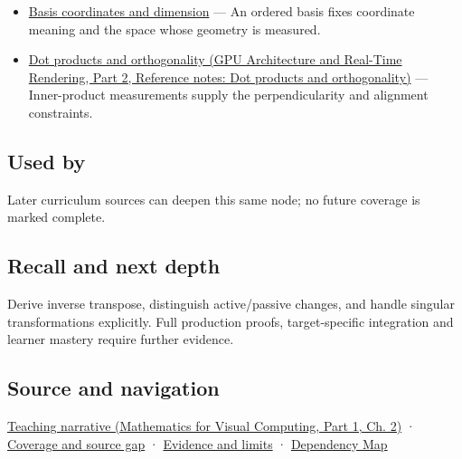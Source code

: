 \begin{itemize}
\tightlist
\item
  \hyperref[appendix-ce0341f7ea0d]{Basis coordinates and dimension} --- An ordered basis fixes coordinate meaning and the space whose geometry is measured.
\item
  \href{../06-GPU-Architecture-and-Real-Time-Rendering-P02/main.pdf\#appendix-8bc4e8fc547c}{Dot products and orthogonality (GPU Architecture and Real-Time Rendering, Part 2, Reference notes: Dot products and orthogonality)} --- Inner-product measurements supply the perpendicularity and alignment constraints.
\end{itemize}

\subsection{Used by}\label{appendix-46da295c6787-used-by}

\hypertarget{appendix-46da295c6787-used-by}{}

Later curriculum sources can deepen this same node; no future coverage is marked complete.

\subsection{Recall and next depth}\label{appendix-46da295c6787-recall-and-next-depth}

\hypertarget{appendix-46da295c6787-recall-and-next-depth}{}

Derive inverse transpose, distinguish active/passive changes, and handle singular transformations explicitly. Full production proofs, target-specific integration and learner mastery require further evidence.

\subsection{Source and navigation}\label{appendix-46da295c6787-source-and-navigation}

\hypertarget{appendix-46da295c6787-source-and-navigation}{}

\href{../02-Mathematics-for-Visual-Computing-P01/main.pdf\#01-foundations-i-ch018-a-normal-is-a-measuring-rule-before-it-is-an-arrow}{Teaching narrative (Mathematics for Visual Computing, Part 1, Ch. 2)} · \hyperref[appendix-fd090d982a15-phase-6---parts-501-600]{Coverage and source gap} · \hyperref[appendix-a103e7846d21-phase-6---source-analysis-and-verification]{Evidence and limits} · \hyperref[appendix-4ad47bdd269a]{Dependency Map}

